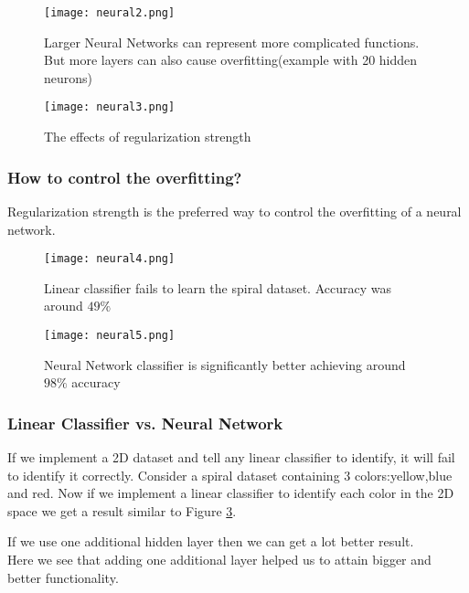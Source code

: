 \begin{figure}[h!]
  \centering
  \texttt{[image: neural2.png]}
  \caption{Larger Neural Networks can represent more complicated functions. But more layers can also cause overfitting(example with 20 hidden neurons)}
  \label{fig6}
\end{figure}

\begin{figure}[h!]
  \centering
  \texttt{[image: neural3.png]}
  \caption{The effects of regularization strength}
  \label{fig7}
\end{figure}

\subsubsection{How to control the overfitting?}
Regularization strength is the preferred way to control the overfitting of a neural network.

\begin{figure}[h!]
  \centering
  \texttt{[image: neural4.png]}
  \caption{Linear classifier fails to learn the spiral dataset. Accuracy was around $49\%$}
  \label{fig8}
\end{figure}

\begin{figure}[h!]
  \centering
  \texttt{[image: neural5.png]}
  \caption{Neural Network classifier is significantly better achieving around $98\%$ accuracy}
  \label{fig9}
\end{figure}


\subsubsection{Linear Classifier vs. Neural Network}
If we implement a 2D dataset and tell any linear classifier to identify, it will fail to identify it correctly. Consider a spiral dataset containing 3 colors:yellow,blue and red. Now if we implement a linear classifier to identify each color in the 2D space we get a result similar to Figure \ref{fig8}.\hfill \break


If we use one additional hidden layer then we can get a lot better result.
\leavevmode
\\
Here we see that adding one additional layer helped us to attain bigger and better functionality.





